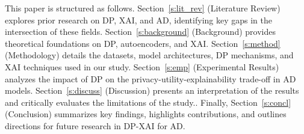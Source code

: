 This paper is structured as follows. Section~\ref{s:lit_rev} (Literature Review) explores prior research on DP, XAI, and AD, identifying key gaps in the intersection of these fields. Section~\ref{s:background} (Background) provides theoretical foundations on DP, autoencoders, and XAI. Section~\ref{s:method} (Methodology) details the datasets, model architectures, DP mechanisms, and XAI techniques used in our study. Section~\ref{s:emp} (Experimental Results) analyzes the impact of DP on the privacy-utility-explainability trade-off in AD models. Section~\ref{s:discuss} (Discussion) presents an interpretation of the results and critically evaluates the limitations of the study.. Finally, Section~\ref{s:concl} (Conclusion) summarizes key findings, highlights contributions, and outlines directions for future research in DP-XAI for AD.